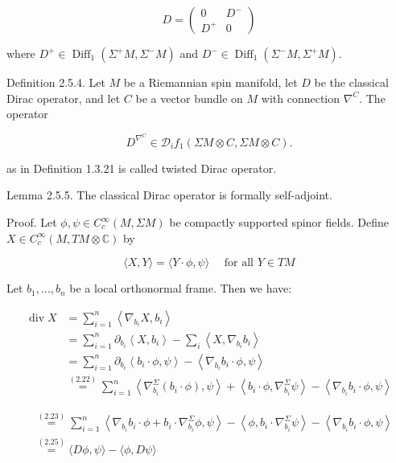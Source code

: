 \documentclass[10pt, letterpaper]{article}
\begin{document}
$$
D=\left(\begin{array}{cc}
0 & D^{-} \\
D^{+} & 0
\end{array}\right)
$$

where $D^{+} \in \operatorname{Diff}_{1}\left(\Sigma^{+} M, \Sigma^{-} M\right)$ and $D^{-} \in \operatorname{Diff}_{1}\left(\Sigma^{-} M, \Sigma^{+} M\right)$.

Definition 2.5.4. Let $M$ be a Riemannian spin manifold, let $D$ be the classical Dirac operator, and let $C$ be a vector bundle on $M$ with connection $\nabla^{C}$. The operator

$$
D^{\nabla^{C}} \in \mathscr{D}_{i} f_{1}(\Sigma M \otimes C, \Sigma M \otimes C) .
$$

as in Definition 1.3.21 is called twisted Dirac operator.

Lemma 2.5.5. The classical Dirac operator is formally self-adjoint.

Proof. Let $\phi, \psi \in C_{c}^{\infty}(M, \Sigma M)$ be compactly supported spinor fields. Define $X \in C_{c}^{\infty}(M, T M \otimes \mathbb{C})$ by

$$
\langle X, Y\rangle=\langle Y \cdot \phi, \psi\rangle \quad \text { for all } Y \in T M
$$

Let $b_{1}, \ldots, b_{n}$ be a local orthonormal frame. Then we have:

$$
\begin{aligned}
\operatorname{div} X & =\sum_{i=1}^{n}\left\langle\nabla_{b_{i}} X, b_{i}\right\rangle \\
& =\sum_{i=1}^{n} \partial_{b_{i}}\left\langle X, b_{i}\right\rangle-\sum_{i}\left\langle X, \nabla_{b_{i}} b_{i}\right\rangle \\
& =\sum_{i=1}^{n} \partial_{b_{i}}\left\langle b_{i} \cdot \phi, \psi\right\rangle-\left\langle\nabla_{b_{i}} b_{i} \cdot \phi, \psi\right\rangle \\
& \stackrel{(2.22)}{=} \sum_{i=1}^{n}\left\langle\nabla_{b_{i}}^{\Sigma}\left(b_{i} \cdot \phi\right), \psi\right\rangle+\left\langle b_{i} \cdot \phi, \nabla_{b_{i}}^{\Sigma} \psi\right\rangle-\left\langle\nabla_{b_{i}} b_{i} \cdot \phi, \psi\right\rangle
\end{aligned}
$$

$$
\begin{aligned}
& \stackrel{(2.23)}{=} \sum_{i=1}^{n}\left\langle\nabla_{b_{i}} b_{i} \cdot \phi+b_{i} \cdot \nabla_{b_{i}}^{\Sigma} \phi, \psi\right\rangle-\left\langle\phi, b_{i} \cdot \nabla_{b_{i}}^{\Sigma} \psi\right\rangle-\left\langle\nabla_{b_{i}} b_{i} \cdot \phi, \psi\right\rangle \\
& \stackrel{(2.25)}{=}\langle D \phi, \psi\rangle-\langle\phi, D \psi\rangle
\end{aligned}
$$
\end{document}
